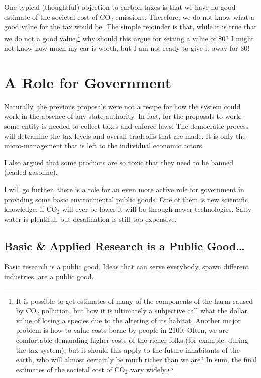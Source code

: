 One typical (thoughtful) objection to carbon taxes is that we have no good
estimate of the societal cost of CO${}_2$ emissions. Therefore, we do not know
what a good value for the tax would be. The simple rejoinder is that, while it
is true that we do not a good value,\footnote{It is possible to get estimates
of many of the components of the harm caused by CO${}_2$ pollution, but how it
is ultimately a subjective call what the dollar value of losing a species due
to the altering of its habitat. Another major problem is how to value costs
borne by people in 2100. Often, we are comfortable demanding higher costs of
the richer folks (for example, during the tax system), but it should this apply
to the future inhabitants of the earth, who will almost certainly be much
richer than we are? In sum, the final estimates of the societal cost of
CO${}_2$ vary widely.} why should this argue for setting a value of \$0? I
might not know how much my car is worth, but I am not ready to give it away for
\$0!

\section{A Role for Government}

Naturally, the previous proposals were not a recipe for how the system could
work in the absence of any state authority. In fact, for the proposals to work,
some entity is needed to collect taxes and enforce laws. The democratic process
will determine the tax levels and overall tradeoffs that are made. It is only
the micro-management that is left to the individual economic actors.

I also argued that some products are so toxic that they need to be banned
(leaded gasoline).

I will go further, there is a role for an even more active role for government
in providing some basic environmental public goods. One of them is new
scientific knowledge: if CO${}_2$ will ever be lower it will be through newer
technologies. Salty water is plentiful, but desalination is still too
expensive.

\subsection{Basic \& Applied Research is a Public Good\ldots}

Basic research is a public good. Ideas that can serve everybody, spawn
different industries, are a public good.

